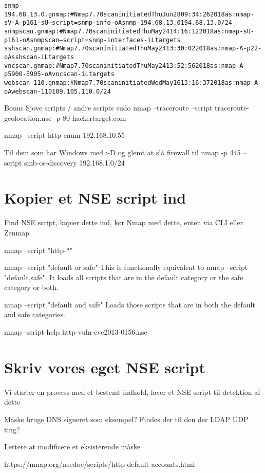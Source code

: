 \documentclass[a4paper,11pt,notitlepage]{report}
\begin{document}
\begin{alltt}
snmp-194.68.13.0.gnmap:# Nmap 7.70 scan initiated Thu Jun 28 09:34:26 2018 as: nmap -sV -A -p 161 -sU --script=snmp-info -oA snmp-194.68.13.0 194.68.13.0/24
snmpscan.gnmap:# Nmap 7.70 scan initiated Thu May 24 14:16:12 2018 as: nmap -sU -p 161 -oA snmpscan --script=snmp-interfaces -iL targets
sshscan.gnmap:# Nmap 7.70 scan initiated Thu May 24 13:30:02 2018 as: nmap -A -p 22 -oA sshscan -iL targets
vncscan.gnmap:# Nmap 7.70 scan initiated Thu May 24 13:52:56 2018 as: nmap -A -p 5900-5905 -oA vncscan -iL targets
webscan-110.gnmap:# Nmap 7.70 scan initiated Wed May 16 13:16:37 2018 as: nmap -A -oA webscan-110 109.105.110.0/24
\end{alltt}


Bonus
Sjove scripts / andre scripts
sudo nmap --traceroute --script traceroute-geolocation.nse -p 80 hackertarget.com

nmap --script http-enum 192.168.10.55

Til dem som har Windows med :-D og glemt at slå firewall til
nmap -p 445 --script smb-os-discovery 192.168.1.0/24


\chapter{Kopier et NSE script ind}
Find NSE script, kopier dette ind, kør Nmap med dette, enten via CLI eller Zenmap

nmap --script "http-*"

		   nmap --script "default or safe"
			   This is functionally equivalent to nmap --script "default,safe". It loads all scripts that are in the default category or the safe category or both.

		   nmap --script "default and safe"
			   Loads those scripts that are in both the default and safe categories.


nmap -script-help http-vuln-cve2013-0156.nse

\chapter{Skriv vores eget NSE script}

Vi starter en process med et bestemt indhold, laver et NSE script til detektion af dette

Måske bruge DNS signeret som eksempel?
Findes der til den der LDAP UDP ting?

Lettere at modificere et eksisterende måske

https://nmap.org/nsedoc/scripts/http-default-accounts.html
\end{document}
